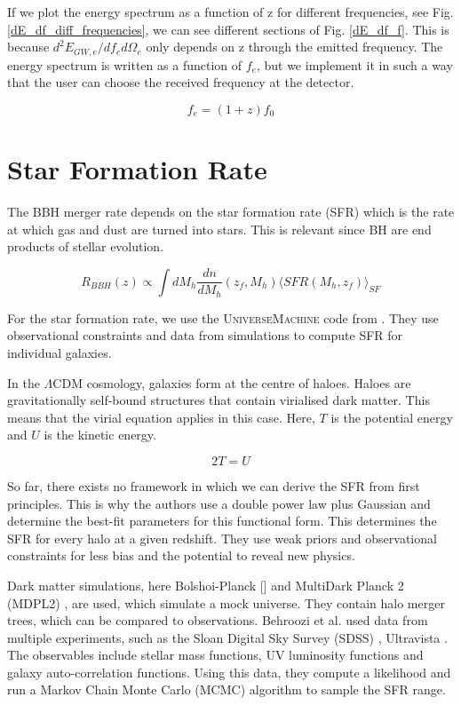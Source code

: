 If we plot the energy spectrum as a function of z for different frequencies, see Fig. \ref{dE_df_diff_frequencies}, we can see different sections of Fig. \ref{dE_df_f}. This is because $d^2 E_{GW,e}/df_e d\Omega_e$ only depends on z through the emitted frequency. The energy spectrum is written as a function of $f_e$, but we implement it in such a way that the user can choose the received frequency at the detector.


\begin{equation}
    f_e = (1+z)f_0
\end{equation}

\section{Star Formation Rate}

The BBH merger rate depends on the star formation rate (SFR) which is the rate at which gas and dust are turned into stars. This is relevant since BH are end products of stellar evolution.

\begin{equation}
    R_{BBH}(z) \propto \int dM_h \frac{dn}{dM_h}(z_f, M_h)\langle SFR(M_h, z_f)\rangle_{SF}
\end{equation}


For the star formation rate, we use the \textsc{UniverseMachine} code from \cite{behroozi_universemachine_2019}. They use observational constraints and data from simulations to compute SFR for individual galaxies.

In the $\Lambda$CDM cosmology, galaxies form at the centre of haloes. Haloes are gravitationally self-bound structures that contain virialised dark matter. This means that the virial equation applies in this case. Here, $T$ is the potential energy and $U$ is the kinetic energy.

\begin{equation}
    2T=U
\end{equation}

So far, there exists no framework in which we can derive the SFR from first principles. This is why the authors use a double power law plus Gaussian and determine the best-fit parameters for this functional form. This determines the SFR for every halo at a given redshift. They use weak priors and observational constraints for less bias and the potential to reveal new physics.

Dark matter simulations, here Bolshoi-Planck [\cite{klypin_dark_2011}] and MultiDark Planck 2 (MDPL2) \cite{klypin_multidark_2016}, are used, which simulate a mock universe. They contain halo merger trees, which can be compared to observations. Behroozi et al. used data from multiple experiments, such as the Sloan Digital Sky Survey (SDSS) \cite{abazajian_seventh_2009}, Ultravista \cite{mccracken_ultravista_2012}. The observables include stellar mass functions, UV luminosity functions and galaxy auto-correlation functions.
Using this data, they compute a likelihood and run a Markov Chain Monte Carlo (MCMC) algorithm to sample the SFR range.

